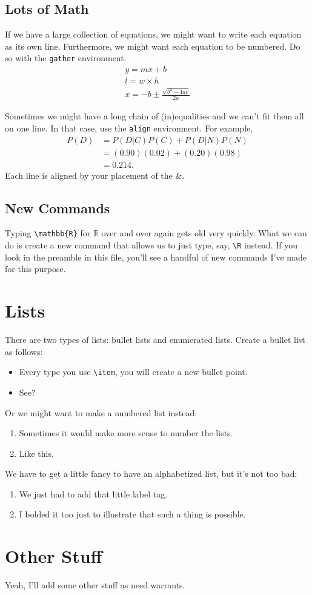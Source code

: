 \documentclass[12pt]{article}
\newcommand{\R}{\mathbb{R}}
\begin{document}
\subsection{Lots of Math}
If we have a large collection of equations, we might want to write each equation as its own 
line. Furthermore, we might want each equation to be numbered. Do so with the \verb|gather|
environment. 
\begin{gather}
	y=mx+b	\\
	l=w \times h	\\
	x=-b \pm \frac{\sqrt{b^2 - 4ac}}{2a}
\end{gather}

Sometimes we might have a long chain of (in)equalities and we can't fit them all on one line.
In that case, use the \verb|align| environment. For example, 
\begin{align*}
	 P(D) &= P(D|C)P(C) + P(D|N)P(N) \\
	  	&= (0.90)(0.02) + (0.20)(0.98) \\ 
	  	&= 0.214.
\end{align*}
Each line is aligned by your placement of the \&.

	
\subsection{New Commands}
	
	Typing \verb|\mathbb{R}| for $\mathbb{R}$ over and over again gets old very quickly. 
	What we can do is create a new command that allows us to just type, say, \verb|\R| 
	instead. If you look in the preamble in this file, you'll see a handful of new commands
	I've made for this purpose. 
	
	
\section{Lists}

There are two types of lists: bullet lists and enumerated lists. Create a bullet list as follows:
\begin{itemize}	
	\item Every type you use \verb|\item|, you will create a new bullet point.
	
	\item See?
\end{itemize}
Or we might want to make a numbered list instead:
\begin{enumerate}
	\item Sometimes it would make more sense to number the lists.
	
	\item Like this. 
\end{enumerate}
We have to get a little fancy to have an alphabetized list, but it's not too bad:
\begin{enumerate}[label=\textbf{(\alph*)}]
	\item We just had to add that little label tag.
	
	\item I bolded it too just to illustrate that such a thing is possible.
\end{enumerate}
	
	
	\section{Other Stuff}
	
	Yeah, I'll add some other stuff as need warrants. 
 
	
\end{document}
